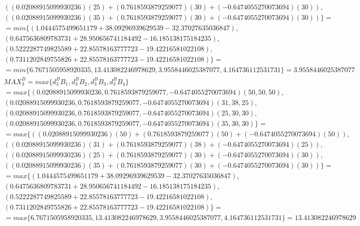 \documentclass[a4paper]{article}
\begin{document}
\begin{align*}
		\\&((0.02088915099930236)(25) + (0.7618593879259077)(30) + (-0.6474055270073694)(30)), 
		\\&((0.02088915099930236)(35) + (0.7618593879259077)(30) + (-0.6474055270073694)(30))\}=
		\\
		&=min\{
		(1.0444575499651179+ 38.09296939629539 -32.37027635036847), 
		\\&(0.6475636809783731+ 28.950656741184492 -16.185138175184235), 
		\\&(0.5222287749825589+ 22.85578163777723 -19.42216581022108), 
		\\&(0.7311202849755826+ 22.85578163777723 -19.42216581022108)\}=
		\\&=min\{
		6.7671505958920335, 
		13.413082246978629, 
		3.9558446025387077, 
		4.164736112531731\} = 3.9558446025387077
		\\
		&MAX_3^B = max\{d_3^B B_1, d_3^B B_2, d_3^B B_3, d_3^B B_4\} 
		\\
		&= max\{
		(0.02088915099930236, 0.7618593879259077, -0.6474055270073694) (50, 50, 50), 
		\\&(0.02088915099930236, 0.7618593879259077, -0.6474055270073694) (31, 38, 25), 
		\\&(0.02088915099930236, 0.7618593879259077, -0.6474055270073694) (25, 30, 30), 
		\\&(0.02088915099930236, 0.7618593879259077, -0.6474055270073694) (35, 30, 30)\}=
		\\
		&= max\{
		((0.02088915099930236)(50) + (0.7618593879259077)(50) + (-0.6474055270073694)(50)), 
		\\&((0.02088915099930236)(31) + (0.7618593879259077)(38) + (-0.6474055270073694)(25)), 
		\\&((0.02088915099930236)(25) + (0.7618593879259077)(30) + (-0.6474055270073694)(30)), 
		\\&((0.02088915099930236)(35) + (0.7618593879259077)(30) + (-0.6474055270073694)(30))\}=
		\\
		&=max\{
		(1.0444575499651179+ 38.09296939629539 -32.37027635036847), 
		\\&(0.6475636809783731+ 28.950656741184492 -16.185138175184235), 
		\\&(0.5222287749825589+ 22.85578163777723 -19.42216581022108), 
		\\&(0.7311202849755826+ 22.85578163777723 -19.42216581022108)\}=
		\\&=max\{
		6.7671505958920335, 
		13.413082246978629, 
		3.9558446025387077, 
		4.164736112531731\} = 13.413082246978629
	\end{align*}
\end{document}
